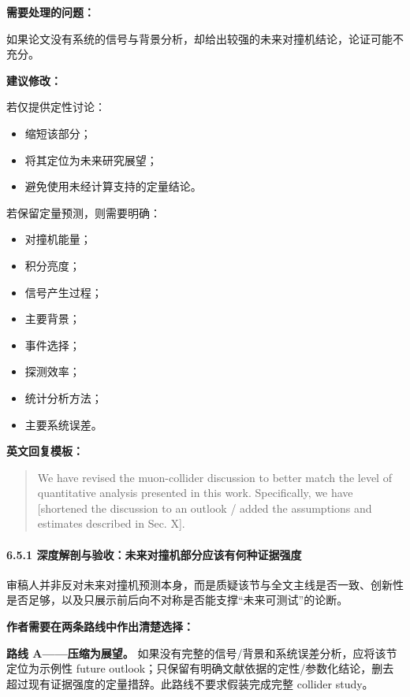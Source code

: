 \documentclass[
  chinese,
  UTF8]{ctexart}
\providecommand{\tightlist}{%
  \setlength{\itemsep}{0pt}\setlength{\parskip}{0pt}}
\begin{document}
\textbf{需要处理的问题：}

如果论文没有系统的信号与背景分析，却给出较强的未来对撞机结论，论证可能不充分。

\textbf{建议修改：}

若仅提供定性讨论：

\begin{itemize}
\tightlist
\item
  缩短该部分；
\item
  将其定位为未来研究展望；
\item
  避免使用未经计算支持的定量结论。
\end{itemize}

若保留定量预测，则需要明确：

\begin{itemize}
\tightlist
\item
  对撞机能量；
\item
  积分亮度；
\item
  信号产生过程；
\item
  主要背景；
\item
  事件选择；
\item
  探测效率；
\item
  统计分析方法；
\item
  主要系统误差。
\end{itemize}

\textbf{英文回复模板：}

\begin{quote}
We have revised the muon-collider discussion to better match the level
of quantitative analysis presented in this work. Specifically, we have
{[}shortened the discussion to an outlook / added the assumptions and
estimates described in Sec. X{]}.
\end{quote}

\paragraph{6.5.1
深度解剖与验收：未来对撞机部分应该有何种证据强度}\label{ux6df1ux5ea6ux89e3ux5256ux4e0eux9a8cux6536ux672aux6765ux5bf9ux649eux673aux90e8ux5206ux5e94ux8be5ux6709ux4f55ux79cdux8bc1ux636eux5f3aux5ea6}

审稿人并非反对未来对撞机预测本身，而是质疑该节与全文主线是否一致、创新性是否足够，以及只展示前后向不对称是否能支撑``未来可测试''的论断。

\textbf{作者需要在两条路线中作出清楚选择：}

\textbf{路线 A------压缩为展望。}
如果没有完整的信号/背景和系统误差分析，应将该节定位为示例性 future
outlook；只保留有明确文献依据的定性/参数化结论，删去超过现有证据强度的定量措辞。此路线不要求假装完成完整
collider study。
\end{document}
